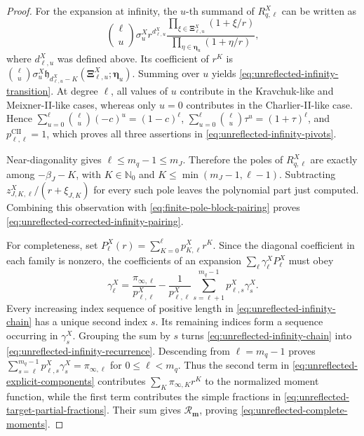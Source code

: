 \documentclass[10pt,a4paper]{amsart}
\newcommand{\Nzero}{\mathbb N_0}
\newcommand{\mm}{\boldsymbol m}
\begin{document}
\begin{proof}
For the expansion at infinity, the \(u\)-th summand of
\(R_{q,\ell}^X\) can be written as
\[
 \binom\ell u\sigma_u^X
 r^{d_{\ell,u}^X}
 \frac{\prod_{\xi\in\boldsymbol\Xi_{\ell,u}^X}(1+\xi/r)}
      {\prod_{\eta\in\boldsymbol\eta_u}(1+\eta/r)},
\]
where \(d_{\ell,u}^X\) was defined above. Its coefficient of \(r^K\) is
\(\binom\ell u\sigma_u^X
\mathfrak h_{d_{\ell,u}^X-K}
(\boldsymbol\Xi_{\ell,u}^X;\boldsymbol\eta_u)\).
Summing over \(u\) yields
\eqref{eq:unreflected-infinity-transition}.  At degree \(\ell\), all
values of \(u\) contribute in the Kravchuk-like and Meixner-II-like cases, whereas
only \(u=0\) contributes in the Charlier-II-like case. Hence
\(\sum_{u=0}^{\ell}\binom\ell u(-c)^u=(1-c)^\ell\),
\(\sum_{u=0}^{\ell}\binom\ell u\tau^u=(1+\tau)^\ell\), and
\(p_{\ell,\ell}^{\mathrm{CII}}=1\),
which proves all three assertions in
\eqref{eq:unreflected-infinity-pivots}.

Near-diagonality gives \(\ell\le m_q-1\le m_J\).  Therefore the poles
of \(R_{q,\ell}^X\) are exactly among
\(-\beta_J-K\), with
\(K\in\Nzero\) and \(K\le\min(m_J-1,\ell-1)\). Subtracting
\(z_{J,K,\ell}^X/(r+\xi_{J,K})\) for every such pole leaves the
polynomial part just computed.  Combining this observation with
\eqref{eq:finite-pole-block-pairing} proves
\eqref{eq:unreflected-corrected-infinity-pairing}.

For completeness, set
\(P_\ell^X(r)=\sum_{K=0}^{\ell}p_{K,\ell}^Xr^K\).  Since the diagonal
coefficient in each family is nonzero, the coefficients of an expansion
\(\sum_\ell\gamma_\ell^XP_\ell^X\) must obey
\begin{equation}
 \gamma_\ell^X
 =\frac{\pi_{\infty,\ell}}{p_{\ell,\ell}^X}
 -\frac1{p_{\ell,\ell}^X}
  \sum_{s=\ell+1}^{m_q-1}p_{\ell,s}^X\gamma_s^X.
 \label{eq:unreflected-infinity-recurrence}
\end{equation}
Every increasing index sequence of positive length in
\eqref{eq:unreflected-infinity-chain} has a unique second index \(s\).
Its remaining indices form a sequence occurring in \(\gamma_s^X\).
Grouping the sum by \(s\) turns
\eqref{eq:unreflected-infinity-chain} into
\eqref{eq:unreflected-infinity-recurrence}. Descending from
\(\ell=m_q-1\) proves
\(\sum_{s=\ell}^{m_q-1}p_{\ell,s}^X\gamma_s^X
=\pi_{\infty,\ell}\) for \(0\le\ell<m_q\).
Thus the second term in
\eqref{eq:unreflected-explicit-components} contributes
\(\sum_K\pi_{\infty,K}r^K\) to the normalized moment function, while the
first term contributes the simple fractions in
\eqref{eq:unreflected-target-partial-fractions}. Their sum gives
\(\mathcal R_{\mm}\), proving
\eqref{eq:unreflected-complete-moments}.


\end{proof}
\end{document}
